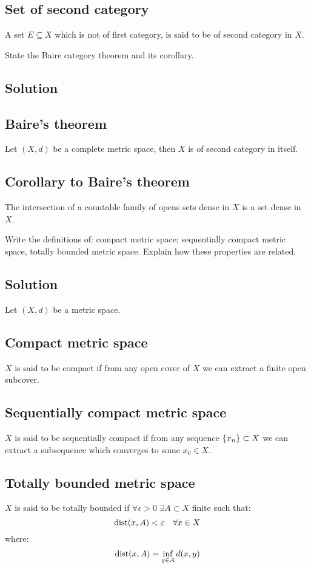 \subsection{Set of second category}
A set $E \subseteq X$ which is not of first category, is said to be of second category in $X$.


\question
State the Baire category theorem and its corollary.

\subsection*{Solution}

\subsection{Baire's theorem} \label{Baire}
Let $(X,d)$ be a complete metric space, then $X$ is of second category in itself.

\subsection{Corollary to Baire's theorem}
The intersection of a countable family of opens sets dense in $X$ is a set dense in $X$.

\question
Write the definitions of: compact metric space; sequentially compact metric space, totally bounded metric space. Explain how these properties are related.

\subsection*{Solution}
Let $(X,d)$ be a metric space.

\subsection{Compact metric space}
$X$ is said to be compact if from any open cover of $X$ we can extract a finite open subcover.

\subsection{Sequentially compact metric space}
$X$ is said to be sequentially compact if from any sequence $\{ x_n \} \subset X$ we can extract a subsequence which converges to some $x_0\in X$.

\subsection{Totally bounded metric space}
$X$ is said to be totally bounded if $\forall \epsilon>0$ $\exists A \subset X$ finite such that:
\[
    \operatorname*{dist}(x,A)<\varepsilon \quad \forall x \in X     
\]
where:
\[
   \operatorname*{dist}(x,A) = \inf_{ y \in A } d(x,y) 
\]

